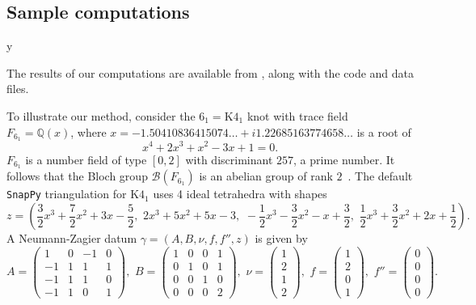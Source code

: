 \documentclass[12pt]{amsart}
\theoremstyle{definition}
\def\printname#1{
        \if\draft y
                \smash{\makebox[0pt]{\hspace{-0.5in}
                        \raisebox{8pt}{\tt\tiny #1}}}
        \fi
}
\def\lbl#1{\label{#1}\printname{#1}}
\def\BQ{\mathbb Q}
\def\ga{\gamma}
\def\calB{\mathcal{B}}
\def\calB{\mathcal{B}}
\begin{document}
\subsection{Sample computations}
\lbl{sub.sample}

The results of our computations are available from \cite{nloop-compute},
along with the code and data files.

To illustrate our method, consider the $6_1=\mathrm{K4}_1$ knot with trace
field $F_{6_1}=\BQ(x)$, where $x=-1.50410836415074\dots 
+ i 1.22685163774658\dots $ 
is a root of
$$
x^4 + 2 x^3 + x^2 - 3 x + 1 = 0.
$$
$F_{6_1}$ is a number field of type $[0,2]$ with discriminant $257$, a prime
number. It follows that the Bloch group $\calB(F_{6_1})$ is an abelian group
of rank $2$~\cite{suslin,zi}. The default \texttt{SnapPy} 
triangulation for $\mathrm{K4}_1$ uses 4 ideal tetrahedra with shapes 
\small{
$$
z=\left(\frac{3}{2} x^{3} + \frac{7}{2} x^{2} + 3 x - \frac{5}{2}, \,\,
2 x^{3} + 5 x^{2} + 5 x - 3, \,\,
-\frac{1}{2} x^{3} - \frac{3}{2} x^{2} - x + \frac{3}{2}, \,\,
\frac{1}{2} x^{3} + \frac{3}{2} x^{2} + 2 x + \frac{1}{2} \right).
$$
}
A Neumann-Zagier datum $\ga=(A,B,\nu,f,f'',z)$ is given by
$$
A = \left(\begin{array}{rrrr}
1 & 0 & -1 & 0 \\
-1 & 1 & 1 & 1 \\
-1 & 1 & 1 & 0 \\
-1 & 1 & 0 & 1
\end{array}\right), \,\,
B = \left(\begin{array}{rrrr}
1 & 0 & 0 & 1 \\
0 & 1 & 0 & 1 \\
0 & 0 & 1 & 0 \\
0 & 0 & 0 & 2
\end{array}\right), \,\, 
\nu = \left(\begin{array}{r} 
1 \\ 2 \\ 1 \\ 2 
\end{array}\right), \,\, 
f = \left(\begin{array}{r} 
1 \\ 2 \\ 0 \\ 1
\end{array}\right), \,\, 
f'' = \left(\begin{array}{r} 
0 \\ 0 \\ 0 \\ 0
\end{array}\right).
$$
\end{document}
